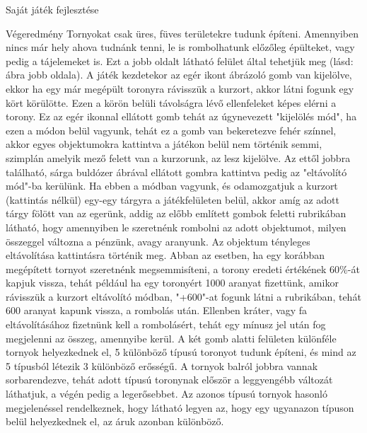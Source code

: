 \begin{MyChapter}{Saját játék fejlesztése}
\begin{MySection}{Végeredmény}
		Tornyokat csak üres, füves területekre tudunk építeni. Amennyiben nincs már hely ahova tudnánk tenni, le is rombolhatunk előzőleg épülteket, vagy pedig a tájelemeket is. Ezt a jobb oldalt látható felület által tehetjük meg (lásd:  ábra jobb oldala).		
		A játék kezdetekor az egér ikont ábrázoló gomb van kijelölve, ekkor ha egy már megépült toronyra rávisszük a kurzort, akkor látni fogunk egy kört körülötte. Ezen a körön belüli távolságra lévő ellenfeleket képes elérni a torony. Ez az egér ikonnal ellátott gomb tehát az úgynevezett "kijelölés mód", ha ezen a módon belül vagyunk, tehát ez a gomb van bekeretezve fehér színnel, akkor egyes objektumokra kattintva a játékon belül nem történik semmi, szimplán amelyik mező felett van a kurzorunk, az lesz kijelölve.
		Az ettől jobbra található, sárga buldózer ábrával ellátott gombra kattintva pedig az "eltávolító mód"-ba kerülünk. Ha ebben a módban vagyunk, és odamozgatjuk a kurzort (kattintás nélkül) egy-egy tárgyra a játékfelületen belül, akkor amíg az adott tárgy fölött van az egerünk, addig az előbb említett gombok feletti rubrikában látható, hogy amennyiben le szeretnénk rombolni az adott objektumot, milyen összeggel változna a pénzünk, avagy aranyunk. Az objektum tényleges eltávolítása kattintásra történik meg.
		Abban az esetben, ha egy korábban megépített tornyot szeretnénk megsemmisíteni, a torony eredeti értékének 60\%-át kapjuk vissza, tehát például ha egy toronyért 1000 aranyat fizettünk, amikor rávisszük a kurzort eltávolító módban, "+600"-at fogunk látni a rubrikában, tehát 600 aranyat kapunk vissza, a rombolás után. Ellenben kráter, vagy fa eltávolításához fizetnünk kell a rombolásért, tehát egy mínusz jel után fog megjelenni az összeg, amennyibe kerül.
		A két gomb alatti felületen különféle tornyok helyezkednek el, 5 különböző típusú toronyot tudunk építeni, és mind az 5 típusból létezik 3 különböző erősségű.
		A tornyok balról jobbra vannak sorbarendezve, tehát adott típusú toronynak először a leggyengébb változát láthatjuk, a végén pedig a legerősebbet. Az azonos típusú tornyok hasonló megjelenéssel rendelkeznek, hogy látható legyen az, hogy egy ugyanazon típuson belül helyezkednek el, az áruk azonban különböző.
		
		

\end{MySection}
\end{MyChapter}
